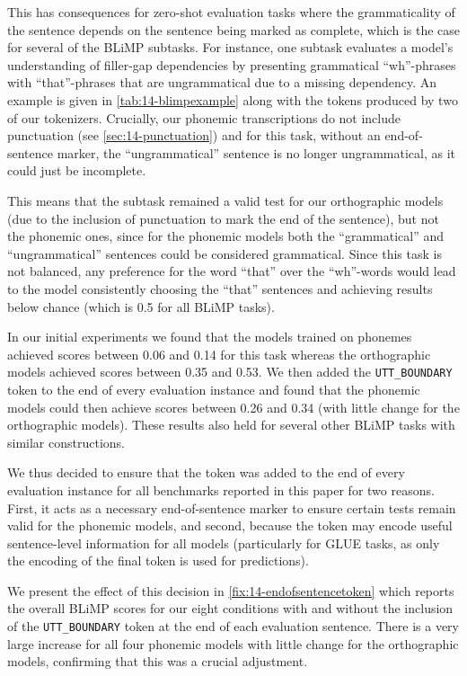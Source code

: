 This has consequences for zero-shot evaluation tasks where the grammaticality of the sentence depends on the sentence being marked as complete, which is the case for several of the BLiMP subtasks. For instance, one subtask evaluates a model's understanding of filler-gap dependencies by presenting grammatical ``wh''-phrases with ``that''-phrases that are ungrammatical due to a missing dependency. An example is given in \cref{tab:14-blimpexample} along with the tokens produced by two of our tokenizers. Crucially, our phonemic transcriptions do not include punctuation (see \cref{sec:14-punctuation}) and for this task, without an end-of-sentence marker, the ``ungrammatical'' sentence is no longer ungrammatical, as it could just be incomplete.

This means that the subtask remained a valid test for our orthographic models (due to the inclusion of punctuation to mark the end of the sentence), but not the phonemic ones, since for the phonemic models both the ``grammatical'' and ``ungrammatical'' sentences could be considered grammatical. Since this task is not balanced, any preference for the word ``that'' over the ``wh''-words would lead to the model consistently choosing the ``that'' sentences and achieving results below chance (which is 0.5 for all BLiMP tasks).

In our initial experiments we found that the models trained on phonemes achieved scores between 0.06 and 0.14 for this task whereas the orthographic models achieved scores between 0.35 and 0.53. We then added the \texttt{UTT\_BOUNDARY} token to the end of every evaluation instance and found that the phonemic models could then achieve scores between 0.26 and 0.34 (with little change for the orthographic models). These results also held for several other BLiMP tasks with similar constructions. 

We thus decided to ensure that the token was added to the end of every evaluation instance for all benchmarks reported in this paper for two reasons. First, it acts as a necessary end-of-sentence marker to ensure certain tests remain valid for the phonemic models, and second, because the token may encode useful sentence-level information for all models (particularly for GLUE tasks, as only the encoding of the final token is used for predictions).

We present the effect of this decision in \cref{fix:14-endofsentencetoken} which reports the overall BLiMP scores for our eight conditions with and without the inclusion of the \texttt{UTT\_BOUNDARY} token at the end of each evaluation sentence. There is a very large increase for all four phonemic models with little change for the orthographic models, confirming that this was a crucial adjustment.

